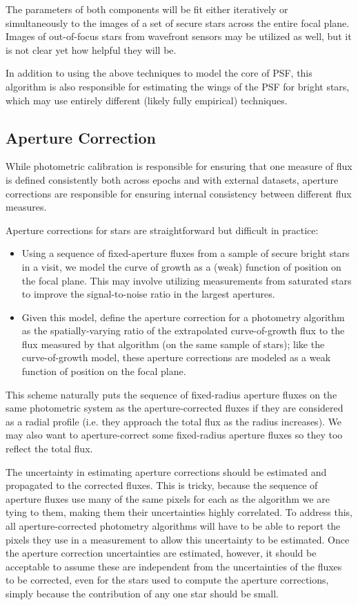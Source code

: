 The parameters of both components will be fit either iteratively or simultaneously to the images of a set of secure stars across the entire focal plane.  Images of out-of-focus stars from wavefront sensors may be utilized as well, but it is not clear yet how helpful they will be.

In addition to using the above techniques to model the core of PSF, this algorithm is also responsible for estimating the wings of the PSF for bright stars, which may use entirely different (likely fully empirical) techniques.

\subsection{Aperture Correction}
\label{sec:acApCorr}

While photometric calibration is responsible for ensuring that one measure of flux is defined consistently both across epochs and with external datasets, aperture corrections are responsible for ensuring internal consistency between different flux measures.

Aperture corrections for stars are straightforward but difficult in practice:
\begin{itemize}
\item Using a sequence of fixed-aperture fluxes from a sample of secure bright stars in a visit, we model the curve of growth as a (weak) function of position on the focal plane.  This may involve utilizing measurements from saturated stars to improve the signal-to-noise ratio in the largest apertures.
\item Given this model, define the aperture correction for a photometry algorithm as the spatially-varying ratio of the extrapolated curve-of-growth flux to the flux measured by that algorithm (on the same sample of stars); like the curve-of-growth model, these aperture corrections are modeled as a weak function of position on the focal plane.
\end{itemize}
This scheme naturally puts the sequence of fixed-radius aperture fluxes on the same photometric system as the aperture-corrected fluxes if they are considered as a radial profile (i.e. they approach the total flux as the radius increases).  We may also want to aperture-correct some fixed-radius aperture fluxes so they too reflect the total flux.

The uncertainty in estimating aperture corrections should be estimated and propagated to the corrected fluxes.  This is tricky, because the sequence of aperture fluxes use many of the same pixels for each as the algorithm we are tying to them, making them their uncertainties highly correlated.  To address this, all aperture-corrected photometry algorithms will have to be able to report the pixels they use in a measurement to allow this uncertainty to be estimated.  Once the aperture correction uncertainties are estimated, however, it should be acceptable to assume these are independent from the uncertainties of the fluxes to be corrected, even for the stars used to compute the aperture corrections, simply because the contribution of any one star should be small.

